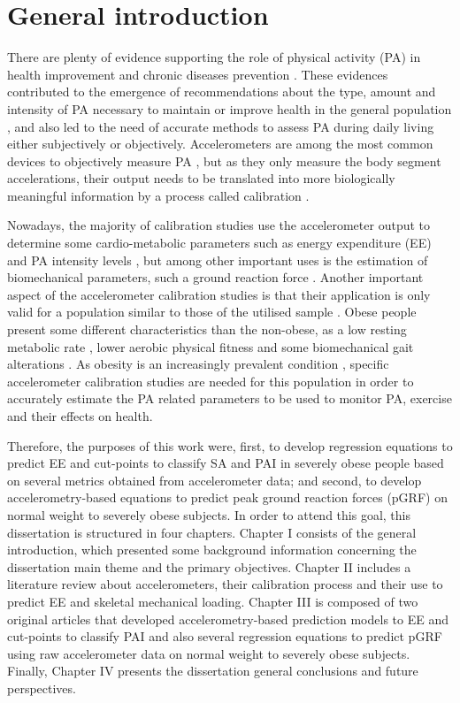 \documentclass[12pt]{article}
\begin{document}
\section*{General introduction}

There are plenty of evidence supporting the role of physical activity (PA) in health improvement and chronic diseases prevention \cite{Guthold_2018, Warburton_2017, Warburton_2006}. These evidences contributed to the emergence of recommendations about the type, amount and intensity of PA necessary to maintain  or improve health in the general population \cite{WHO_2010}, and also led to the need of accurate methods to assess PA during daily living \cite{Montoye_2000, Plasqui_2013} either subjectively or objectively. Accelerometers are among the most common devices to objectively measure PA \cite{Strath_2013}, but as they only measure the body segment accelerations, their output needs to be translated into more biologically meaningful information by a process called calibration \cite{Welk_2005}.
 
 Nowadays, the majority of calibration studies use the accelerometer output to determine some cardio-metabolic parameters such as energy expenditure (EE) and PA intensity levels \cite{Migueles_2017}, but among other important uses is the estimation of biomechanical parameters, such a ground reaction force \cite{Neugebauer_2014}. Another important aspect of the accelerometer calibration studies is that their application is only valid for a population similar to those of the utilised sample \cite{Welk_2005}. Obese people present some different characteristics than the non-obese, as a low resting metabolic rate \cite{Byrne_2005}, lower aerobic physical fitness \cite{Souza_2010} and some biomechanical gait alterations \cite{Bode_2019}. As obesity is an increasingly prevalent condition \cite{Guthold_2018}, specific accelerometer calibration studies are needed for this population in order to accurately estimate the PA related parameters to be used to monitor PA, exercise and their effects on health.

Therefore, the purposes of this work were, first, to develop regression equations to predict EE and cut-points to classify SA and PAI in severely obese people based on several metrics obtained from accelerometer data; and second, to develop accelerometry-based equations to predict peak ground reaction forces (pGRF) on normal weight to severely obese subjects. In order to attend this goal, this dissertation is structured in four chapters. Chapter I consists of the general introduction, which presented some background information concerning the dissertation main theme and the primary objectives. Chapter II includes a literature review about accelerometers, their calibration process and their use to predict EE and skeletal mechanical loading. Chapter III is composed of two original articles that developed accelerometry-based prediction models to EE and cut-points to classify PAI and also several regression equations to predict pGRF using raw accelerometer data on normal weight to severely obese subjects. Finally, Chapter IV presents the  dissertation general conclusions and future perspectives.

\pagebreak



\end{document}
